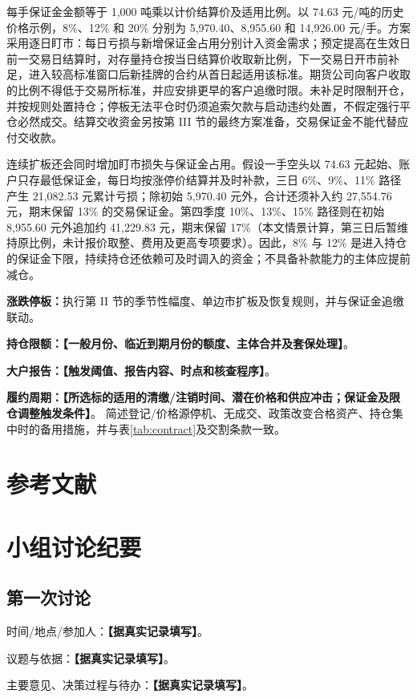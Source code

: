 \documentclass[UTF8,a4paper,11pt,oneside,fontset=fandol]{ctexart}
\newcommand{\fillin}[1]{\textcolor{promptgray}{\textbf{【#1】}}}
\newif\ifIncludeAppendices
\begin{document}
每手保证金金额等于 1,000 吨乘以计价结算价及适用比例。以 74.63 元/吨的历史价格示例，8\%、12\% 和 20\% 分别为 5,970.40、8,955.60 和 14,926.00 元/手。方案采用逐日盯市：每日亏损与新增保证金占用分别计入资金需求；预定提高在生效日前一交易日结算时，对存量持仓按当日结算价收取新比例，下一交易日开市前补足，进入较高标准窗口后新挂牌的合约从首日起适用该标准。期货公司向客户收取的比例不得低于交易所标准，并应安排更早的客户追缴时限\cite{gfexSettlement2025reprint}。未补足时限制开仓，并按规则处置持仓；停板无法平仓时仍须追索欠款与启动违约处置，不假定强行平仓必然成交。结算交收资金另按第 III 节的最终方案准备，交易保证金不能代替应付交收款。

连续扩板还会同时增加盯市损失与保证金占用。假设一手空头以 74.63 元起始、账户只存最低保证金，每日均按涨停价结算并及时补款，三日 6\%、9\%、11\% 路径产生 21,082.53 元累计亏损；除初始 5,970.40 元外，合计还须补入约 27,554.76 元，期末保留 13\% 的交易保证金。第四季度 10\%、13\%、15\% 路径则在初始 8,955.60 元外追加约 41,229.83 元，期末保留 17\%（本文情景计算，第三日后暂维持原比例，未计报价取整、费用及更高专项要求）。因此，8\% 与 12\% 是进入持仓的保证金下限，持续持仓还依赖可及时调入的资金；不具备补款能力的主体应提前减仓。

\noindent\textbf{涨跌停板：}执行第 II 节的季节性幅度、单边市扩板及恢复规则，并与保证金追缴联动。

\noindent\textbf{持仓限额：}\fillin{一般月份、临近到期月份的额度、主体合并及套保处理}。

\noindent\textbf{大户报告：}\fillin{触发阈值、报告内容、时点和核查程序}。

\noindent\textbf{履约周期：}\fillin{所选标的适用的清缴/注销时间、潜在价格和供应冲击；保证金及限仓调整触发条件}。
简述登记/价格源停机、无成交、政策改变合格资产、持仓集中时的备用措施，并与表\ref{tab:contract}及交割条款一致。

\section*{参考文献}
\printbibliography[heading=none]

\ifIncludeAppendices
\clearpage
\appendix
\section{小组讨论纪要}
\subsection*{第一次讨论}
\noindent 时间/地点/参加人：\fillin{据真实记录填写}。\par
\noindent 议题与依据：\fillin{据真实记录填写}。\par
\noindent 主要意见、决策过程与待办：\fillin{据真实记录填写}。\par
\end{document}

